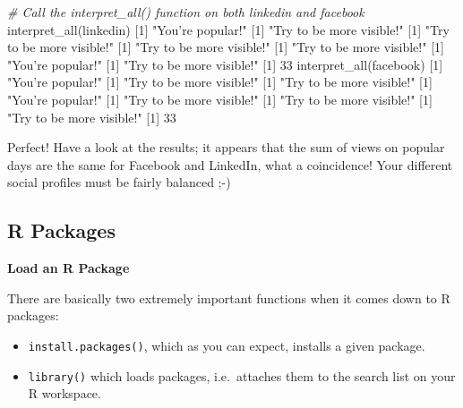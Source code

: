 \documentclass[]{article}
\newcommand{\hlnum}[1]{\textcolor[rgb]{0.816,0.125,0.439}{#1}}%
\newcommand{\hlstr}[1]{\textcolor[rgb]{0.251,0.627,0.251}{#1}}%
\newcommand{\hlcom}[1]{\textcolor[rgb]{0.502,0.502,0.502}{\textit{#1}}}%
\newcommand{\hlstd}[1]{\textcolor[rgb]{0.251,0.251,0.251}{#1}}%
\newcommand{\hlkwd}[1]{\textcolor[rgb]{0.878,0.439,0.125}{#1}}%
\newenvironment{Shaded}{\begin{myshaded}}{\end{myshaded}}
\newcommand{\KeywordTok}[1]{\hlkwd{#1}}
\newcommand{\DecValTok}[1]{\hlnum{#1}}
\newcommand{\StringTok}[1]{\hlstr{#1}}
\newcommand{\CommentTok}[1]{\hlcom{#1}}
\newcommand{\NormalTok}[1]{\hlstd{#1}}
\begin{document}
\begin{Shaded}
\begin{Highlighting}[]
\CommentTok{# Call the interpret_all() function on both linkedin and facebook}
\KeywordTok{interpret_all}\NormalTok{(linkedin)}
\NormalTok{   [}\DecValTok{1}\NormalTok{] }\StringTok{"You're popular!"}
\NormalTok{   [}\DecValTok{1}\NormalTok{] }\StringTok{"Try to be more visible!"}
\NormalTok{   [}\DecValTok{1}\NormalTok{] }\StringTok{"Try to be more visible!"}
\NormalTok{   [}\DecValTok{1}\NormalTok{] }\StringTok{"Try to be more visible!"}
\NormalTok{   [}\DecValTok{1}\NormalTok{] }\StringTok{"Try to be more visible!"}
\NormalTok{   [}\DecValTok{1}\NormalTok{] }\StringTok{"You're popular!"}
\NormalTok{   [}\DecValTok{1}\NormalTok{] }\StringTok{"Try to be more visible!"}
\NormalTok{   [}\DecValTok{1}\NormalTok{] }\DecValTok{33}
\KeywordTok{interpret_all}\NormalTok{(facebook)}
\NormalTok{   [}\DecValTok{1}\NormalTok{] }\StringTok{"You're popular!"}
\NormalTok{   [}\DecValTok{1}\NormalTok{] }\StringTok{"Try to be more visible!"}
\NormalTok{   [}\DecValTok{1}\NormalTok{] }\StringTok{"Try to be more visible!"}
\NormalTok{   [}\DecValTok{1}\NormalTok{] }\StringTok{"You're popular!"}
\NormalTok{   [}\DecValTok{1}\NormalTok{] }\StringTok{"Try to be more visible!"}
\NormalTok{   [}\DecValTok{1}\NormalTok{] }\StringTok{"Try to be more visible!"}
\NormalTok{   [}\DecValTok{1}\NormalTok{] }\StringTok{"Try to be more visible!"}
\NormalTok{   [}\DecValTok{1}\NormalTok{] }\DecValTok{33}
\end{Highlighting}
\end{Shaded}

Perfect! Have a look at the results; it appears that the sum of views on
popular days are the same for Facebook and LinkedIn, what a coincidence!
Your different social profiles must be fairly balanced ;-)

\subsection{R Packages}\label{r-packages}

\textbf{Load an R Package}

There are basically two extremely important functions when it comes down
to R packages:

\begin{itemize}
\item
  \texttt{install.packages()}, which as you can expect, installs a given
  package.
\item
  \texttt{library()} which loads packages, i.e.~attaches them to the
  search list on your R workspace.
\end{itemize}
\end{document}
